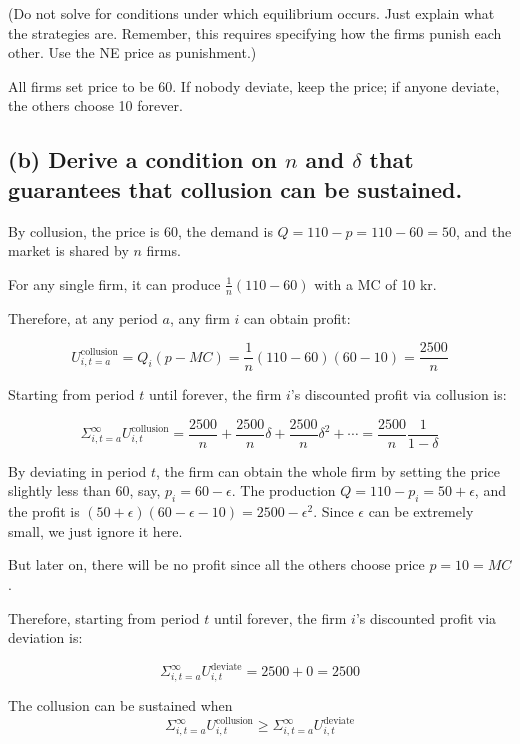 \documentclass{article}
\begin{document}
\medskip 

(Do not solve for conditions under which equilibrium
occurs. Just explain what the strategies are. Remember, this requires
specifying how the firms punish each other. Use the NE
price as punishment.)

\bigskip

All firms set price to be 60. If nobody deviate, keep the price; if anyone deviate, the others choose 10 forever.

\subsection*{(b) Derive a condition on $n$ and $\delta$ that guarantees that collusion can be sustained.}

By collusion, the price is 60, the demand is $Q = 110 -p = 110- 60 =50$, and the
market is shared by $n$ firms.

\smallskip

For any single firm, it can produce $\frac{1}{n}(110-60)$ with a MC of 10 kr.

\smallskip

Therefore, at any period $a$, any firm $i$ can obtain profit:


$$U^{\text{collusion}}_{i,t=a} = Q_i (p-MC) = \frac{1}{n}(110-60) (60-10) = \frac {2500}{n} $$

Starting from period $t$ until forever, the firm $i$'s discounted profit via collusion is:

$$\Sigma^{\infty}_{i,t=a} U^{\text{collusion}}_{i,t}= \frac {2500}{n} + \frac {2500}{n} \delta + \frac {2500}{n}\delta^2 + \cdots = \frac {2500}{n} \frac{1}{1-\delta}$$


By deviating in period $t$, the firm can obtain the whole firm by setting the price slightly less than $60$, say, $p_i = 60 -\epsilon$. The production $Q = 110 - p_i = 50 + \epsilon$, and the profit is $(50 + \epsilon)(60 -\epsilon -10)=2500 - \epsilon^2$. Since $\epsilon$ can be extremely small, we just ignore it here.

\smallskip

But later on, there will be no profit since all the others choose price $p=10=MC$. 

Therefore, starting from period $t$ until forever, the firm $i$'s discounted profit via deviation is:

$$\Sigma^{\infty}_{i,t=a} U^{\text{deviate}}_{i,t}= 2500  + 0 =2500$$

The collusion can be sustained when $$\Sigma^{\infty}_{i,t=a} U^{\text{collusion}}_{i,t} \ge \Sigma^{\infty}_{i,t=a} U^{\text{deviate}}_{i,t}$$
\end{document}
